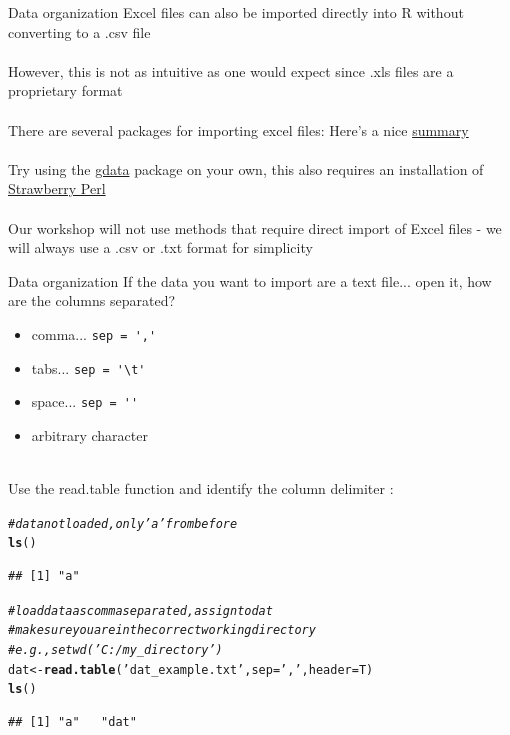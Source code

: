 \documentclass[xcolor=svgnames]{beamer}\usepackage[]{graphicx}\usepackage[]{color}
\makeatletter
\newcommand{\hlstr}[1]{\textcolor[rgb]{0.192,0.494,0.8}{#1}}%
\newcommand{\hlcom}[1]{\textcolor[rgb]{0.678,0.584,0.686}{\textit{#1}}}%
\newcommand{\hlstd}[1]{\textcolor[rgb]{0.345,0.345,0.345}{#1}}%
\newcommand{\hlkwb}[1]{\textcolor[rgb]{0.69,0.353,0.396}{#1}}%
\newcommand{\hlkwc}[1]{\textcolor[rgb]{0.333,0.667,0.333}{#1}}%
\newcommand{\hlkwd}[1]{\textcolor[rgb]{0.737,0.353,0.396}{\textbf{#1}}}%
\newenvironment{kframe}{%
 \def\at@end@of@kframe{}%
 \ifinner\ifhmode%
  \def\at@end@of@kframe{\end{minipage}}%
  \begin{minipage}{\columnwidth}%
 \fi\fi%
 \def\FrameCommand##1{\hskip\@totalleftmargin \hskip-\fboxsep
 \colorbox{shadecolor}{##1}\hskip-\fboxsep
     \hskip-\linewidth \hskip-\@totalleftmargin \hskip\columnwidth}%
 \MakeFramed {\advance\hsize-\width
   \@totalleftmargin\z@ \linewidth\hsize
   \@setminipage}}%
 {\par\unskip\endMakeFramed%
 \at@end@of@kframe}
\newenvironment{knitrout}{}{} %
\makeatother
\begin{document}
\begin{frame}{Data organization}
Excel files can also be imported directly into R without converting to a .csv file \\~\\
However, this is not as intuitive as one would expect since .xls files are a proprietary format \\~\\
There are several packages for importing excel files: Here's a nice \href{http://www.r-bloggers.com/a-million-ways-to-connect-r-and-excel/}{summary} \\~\\
Try using the \href{http://cran.r-project.org/web/packages/gdata/gdata.pdf}{gdata} package on your own, this also requires an installation of \href{http://strawberryperl.com/}{Strawberry Perl}\\~\\
Our workshop will not use methods that require direct import of Excel files - we will always use a .csv or .txt format for simplicity
\end{frame}

\begin{frame}{Data organization}
If the data you want to import are a text file... open it, how are the columns separated?
\begin{itemize}
\item comma... \verb!sep = ','!
\item tabs... \verb!sep = '\t'!
\item space... \verb!sep = ''!
\item arbitrary character\\~\\
\end{itemize}
Use the read.table function and identify the column delimiter :
\begin{knitrout}\scriptsize
{}\color{fgcolor}\begin{kframe}
\begin{alltt}
\hlcom{# data not loaded, only 'a' from before}
\hlkwd{ls}\hlstd{()}
\end{alltt}
\begin{verbatim}
## [1] "a"
\end{verbatim}
\begin{alltt}
\hlcom{# load data as comma separated, assign to dat}
\hlcom{# make sure you are in the correct working directory}
\hlcom{# e.g., setwd('C:/my_directory') }
\hlstd{dat} \hlkwb{<-} \hlkwd{read.table}\hlstd{(}\hlstr{'dat_example.txt'}\hlstd{,}\hlkwc{sep} \hlstd{=} \hlstr{','}\hlstd{,} \hlkwc{header} \hlstd{= T)}
\hlkwd{ls}\hlstd{()}
\end{alltt}
\begin{verbatim}
## [1] "a"   "dat"
\end{verbatim}
\end{kframe}
\end{knitrout}
\end{frame}
\end{document}
